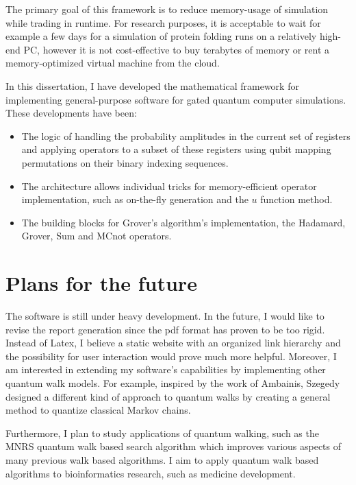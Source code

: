 The primary goal of this framework is to reduce memory-usage of simulation while trading in runtime. For research purposes, it is acceptable to wait for example a few days for a simulation of protein folding runs on a relatively high-end PC, however it is not cost-effective to buy terabytes of memory or rent a memory-optimized virtual machine from the cloud.

In this dissertation, I have developed the mathematical framework for implementing general-purpose software for gated quantum computer simulations. These developments have been:

\begin{itemize}
    \item The logic of handling the probability amplitudes in the current set of registers and applying operators to a subset of these registers using qubit mapping permutations on their binary indexing sequences.
    \item The architecture allows individual tricks for memory-efficient operator implementation, such as on-the-fly generation and the $u$ function method.
    \item The building blocks for Grover's algorithm's implementation, the Hadamard, Grover, Sum and MCnot operators.
\end{itemize}

\section{Plans for the future}

The software is still under heavy development. In the future, I would like to revise the report generation since the pdf format has proven to be too rigid. Instead of Latex, I believe a static website with an organized link hierarchy and the possibility for user interaction would prove much more helpful. Moreover, I am interested in extending my software's capabilities by implementing other quantum walk models. For example, inspired by the work of Ambainis, Szegedy \cite{Szegedy} designed a different kind of approach to quantum walks by creating a general method to quantize classical Markov chains.

Furthermore, I plan to study applications of quantum walking, such as the MNRS quantum walk based search algorithm \cite{MNRS} which improves various aspects of many previous walk based algorithms. I aim to apply quantum walk based algorithms to bioinformatics research, such as medicine development.

